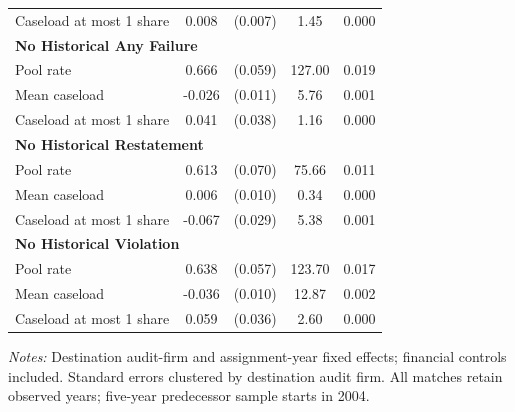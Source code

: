 \documentclass[10pt]{article}
\begin{document}
\begin{minipage}{19cm}
\begin{threeparttable}
\begin{tabular}{p{}cccc}
Caseload at most 1 share & 0.008 & (0.007) & 1.45 & 0.000 \\
\multicolumn{5}{l}{\textbf{No Historical Any Failure}} \\
Pool rate & 0.666 & (0.059) & 127.00 & 0.019 \\
Mean caseload & -0.026 & (0.011) & 5.76 & 0.001 \\
Caseload at most 1 share & 0.041 & (0.038) & 1.16 & 0.000 \\
\multicolumn{5}{l}{\textbf{No Historical Restatement}} \\
Pool rate & 0.613 & (0.070) & 75.66 & 0.011 \\
Mean caseload & 0.006 & (0.010) & 0.34 & 0.000 \\
Caseload at most 1 share & -0.067 & (0.029) & 5.38 & 0.001 \\
\multicolumn{5}{l}{\textbf{No Historical Violation}} \\
Pool rate & 0.638 & (0.057) & 123.70 & 0.017 \\
Mean caseload & -0.036 & (0.010) & 12.87 & 0.002 \\
Caseload at most 1 share & 0.059 & (0.036) & 2.60 & 0.000 \\
\bottomrule
\end{tabular}
\begin{tablenotes}\fontsize{9}{11}\selectfont
\item \raggedright \fontsize{9}{11}\selectfont \textit{Notes:} Destination audit-firm and assignment-year fixed effects; financial controls included. Standard errors clustered by destination audit firm. All matches retain observed years; five-year predecessor sample starts in 2004.
\end{tablenotes}
\end{threeparttable}

\end{minipage}
\end{document}
